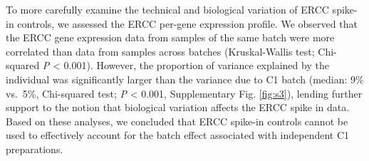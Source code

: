 To more carefully examine the technical and biological variation of ERCC
spike-in controls, we assessed the ERCC per-gene expression profile. We
observed that the ERCC gene expression data from samples of the same
batch were more correlated than data from samples across batches
(Kruskal-Wallis test; Chi-squared \emph{P} \textless{} 0.001). However,
the proportion of variance explained by the individual was significantly
larger than the variance due to C1 batch (median: 9\% vs.~5\%,
Chi-squared test; \emph{P} \textless{} 0.001, Supplementary Fig. \ref{fig:s3}),
lending further support to the notion that biological variation affects
the ERCC spike in data. Based on these analyses, we concluded that ERCC
spike-in controls cannot be used to effectively account for the batch
effect associated with independent C1 preparations.

